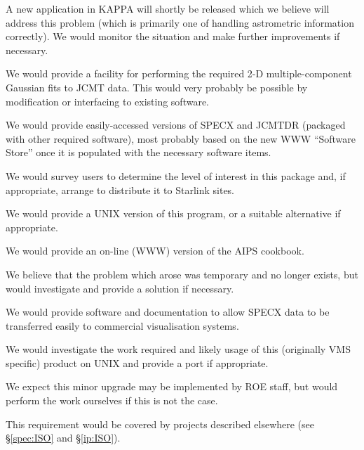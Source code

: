 {A new application in KAPPA will shortly be released which we believe
will address this problem (which is primarily one of handling
astrometric information correctly). We would monitor the situation and
make further improvements if necessary.}

{We would provide a facility for performing the required 2-D
multiple-component Gaussian fits to JCMT data. This would very
probably be possible by modification or interfacing to existing
software.}

{We would provide easily-accessed versions of SPECX and JCMTDR
(packaged with other required software), most probably based on the
new WWW ``Software Store'' once it is populated with the necessary
software items.}

{We would survey users to determine the level of interest in this
package and, if appropriate, arrange to distribute it to Starlink
sites.}

{We would provide a UNIX version of this program, or a suitable
alternative if appropriate.}

{We would provide an on-line (WWW) version of the AIPS cookbook.}

{We believe that the problem which arose was temporary and no longer
exists, but would investigate and provide a solution if necessary.}

{We would provide software and documentation to allow SPECX data to be
transferred easily to commercial visualisation systems.}

{We would investigate the work required and likely usage of this
(originally VMS specific) product on UNIX and provide a port if
appropriate.}

{We expect this minor upgrade may be implemented by ROE staff, but
would perform the work ourselves if this is not the case.}

{This requirement would be covered by projects described elsewhere
(see \S\ref{spec:ISO} and \S\ref{ip:ISO}).}

